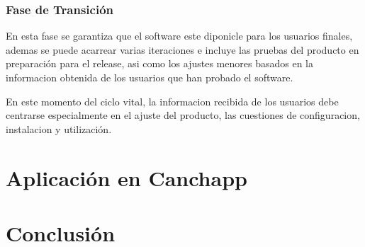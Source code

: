 \documentclass[spanish]{udpreport}
\begin{document}
\subsection{Fase de Transición}
En esta fase se garantiza que el software este diponicle para los usuarios finales, ademas se puede acarrear varias iteraciones e incluye las pruebas del producto en preparación para el release, asi como los ajustes menores basados en la informacion obtenida de los usuarios que han probado el software.\par
En este momento del ciclo vital, la informacion recibida de los usuarios debe centrarse especialmente en el ajuste del producto, las cuestiones de configuracion, instalacion y utilización.

\chapter{Aplicación en Canchapp}

\chapter{Conclusión}


\end{document}
